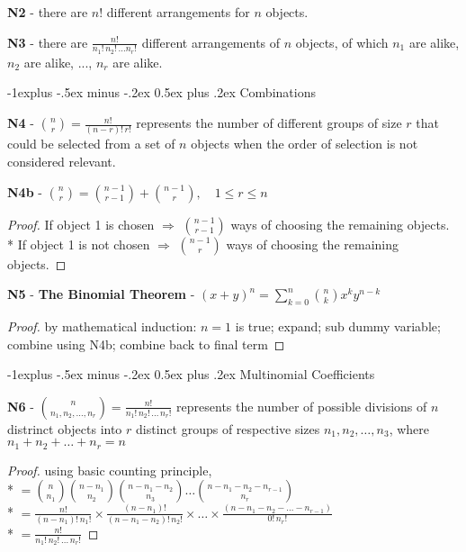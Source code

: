 \documentclass[10pt, landscape]{article}
\makeatletter
\renewcommand{\subsection}{\@startsection{subsection}{2}{0mm}%
  {-1explus -.5ex minus -.2ex}%
  {0.5ex plus .2ex}%
{\normalfont\normalsize\bfseries}}
\makeatother
\begin{document}
\begin{multicols*}{3}
  \textbf{N2} - there are $n!$ different arrangements for $n$ objects.

  \textbf{N3} - there are $\frac{n!}{n_1!\, n_2!\, \dots n_r!}$ different arrangements of $n$ objects, 
  of which $n_1$ are alike, $n_2$ are alike, ..., $n_r$ are alike.

  \subsection{Combinations}

  \textbf{N4} - $\binom{n}{r} = \frac{n!}{(n-r)!\,r!}$ represents the number of different groups of size $r$ that could be selected from a set of $n$ objects when the order of selection is not considered relevant.

  \textbf{N4b} - $\binom{n}{r} = \binom{n-1}{r-1} + \binom{n-1}{r}, \quad 1 \leq r \leq n$
  \begin{proof}
    If object 1 is chosen $\Rightarrow$ $\binom{n-1}{r-1}$ ways of choosing the remaining objects.
    \\* If object 1 is not chosen $\Rightarrow$ $\binom{n-1}{r}$ ways of choosing the remaining objects.
  \end{proof}

  \textbf{N5} - \textbf{The Binomial Theorem} - \( {\displaystyle{(x+y)^n = \sum^n_{k=0} \binom{n}{k} x^k y^{n-k} }} \) 
  \begin{proof}
    by mathematical induction: $n=1$ is true; expand; sub dummy variable; combine using N4b; combine back to final term
  \end{proof}

  \subsection{Multinomial Coefficients}

  \textbf{N6} - $\binom{n}{n_1, n_2, \dots, n_r} = \frac{n!}{n_1!\, n_2!\, \dots \, n_r!}$  
  represents the number of possible divisions of $n$ distrinct objects 
  into $r$ distinct groups of respective sizes $n_1, n_2, \dots, n_3$, 
  where $n_1 + n_2 + \dots + n_r = n$
  \begin{proof}
    using basic counting principle, 
    \\* $= \binom{n}{n_1} \binom{n-n_1}{n_2} \binom{n-n_1-n_2}{n_3} \dots \binom{n-n_1-n_2-n_{r-1}}{n_r}$
    \\* $= \frac{n!}{(n-n_1)!\,n_1!} \times \frac{(n-n_1)!}{(n-n_1-n_2)!\, n_2!} \times \dots \times \frac{( n-n_1-n_2-\dots -n_{r-1} )}{0!\, n_r!}$
    \\* $= \frac{n!}{n_1!\, n_2! \, \dots \, n_r!}$
  \end{proof}


\end{multicols*}
\end{document}
